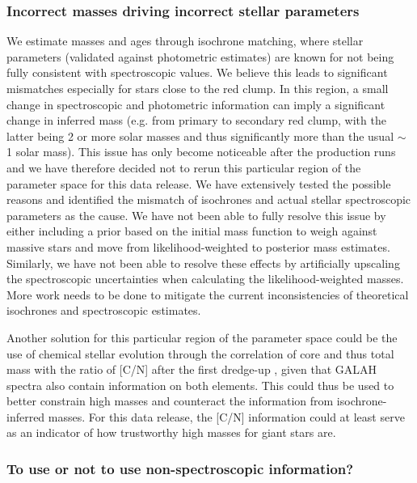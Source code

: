 \documentclass[
  journal=pasa,
  manuscript=research-paper, %
  year=2024,
  volume=37
]{cup-journal}
\begin{document}
\subsubsection{Incorrect masses driving incorrect stellar parameters}

We estimate masses and ages through isochrone matching, where stellar parameters (validated against photometric estimates) are known for not being fully consistent with spectroscopic values.
We believe this leads to significant mismatches especially for stars close to the red clump. In this region, a small change in spectroscopic and photometric information can imply a significant change in inferred mass (e.g. from primary to secondary red clump, with the latter being 2 or more solar masses and thus significantly more than the usual $\sim$ 1 solar mass). This issue has only become noticeable after the production runs and we have therefore decided not to rerun this particular region of the parameter space for this data release. We have extensively tested the possible reasons and identified the mismatch of isochrones and actual stellar spectroscopic parameters as the cause. We have not been able to fully resolve this issue by either including a prior based on the initial mass function to weigh against massive stars \citep[see e.g.][]{Sharma2018} and move from likelihood-weighted to posterior mass estimates. Similarly, we have not been able to resolve these effects by artificially upscaling the spectroscopic uncertainties when calculating the likelihood-weighted masses. More work needs to be done to mitigate the current inconsistencies of theoretical isochrones and spectroscopic estimates.

Another solution for this particular region of the parameter space could be the use of chemical stellar evolution through the correlation of core and thus total mass with the ratio of [C/N] after the first dredge-up \citep{Masseron2015, Martig2016}, given that GALAH spectra also contain information on both elements. This could thus be used to better constrain high masses and counteract the information from isochrone-inferred masses. For this data release, the [C/N] information could at least serve as an indicator of how trustworthy high masses for giant stars are.

\subsubsection{To use or not to use non-spectroscopic information?}
\end{document}
